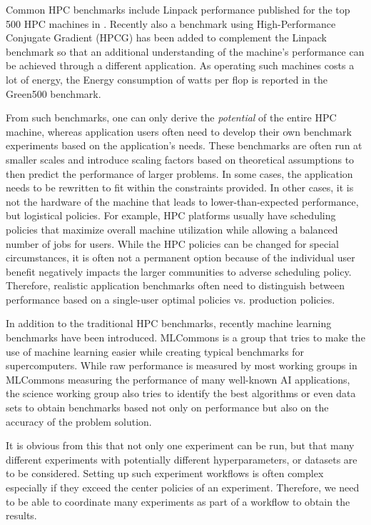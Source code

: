 \documentclass[utf8]{FrontiersinVancouver} %
\begin{document}
Common HPC benchmarks include Linpack performance published for the top 500 HPC machines in \citep{www-top500}. Recently also a benchmark using High-Performance Conjugate Gradient (HPCG) has been added to complement the Linpack benchmark so that an additional understanding of the machine's performance can be achieved \citep{www-top500} through a different application.  As operating such machines costs a lot of energy, the Energy consumption of watts per flop is reported in the Green500 benchmark\citep{green500}.

From such benchmarks, one can only derive the {\em potential} of the entire HPC machine, whereas application users often need to develop their own benchmark experiments based on the application's needs. These benchmarks are often run at smaller scales and introduce scaling factors based on theoretical assumptions to then predict the performance of larger problems. In some cases, the application needs to be rewritten to fit within the constraints provided. In other cases, it is not the hardware of the machine that leads to lower-than-expected performance, but logistical policies. For example, HPC platforms usually have scheduling policies that maximize overall machine utilization while allowing a balanced number of jobs for users. While the HPC policies can be changed for special circumstances, it is often not a permanent option because of the individual user benefit negatively impacts the larger communities to adverse scheduling policy. Therefore, realistic application benchmarks often need to distinguish between performance based on a single-user optimal policies vs. production policies.

In addition to the traditional HPC benchmarks, recently machine learning benchmarks have been introduced. MLCommons is a group that tries to make the use of machine learning easier while creating typical benchmarks for supercomputers. While raw performance is measured by most working groups in MLCommons measuring the performance of many well-known AI applications, the science working group also tries to identify the best algorithms or even data sets to obtain benchmarks based not only on performance but also on the accuracy of the problem solution.

It is obvious from this that not only one experiment can be run, but that many different experiments with potentially different hyperparameters, or datasets are to be considered. Setting up such experiment workflows is often complex especially if they exceed the center policies of an experiment. Therefore, we need to be able to coordinate many experiments as part of a workflow to obtain the results.
\end{document}
